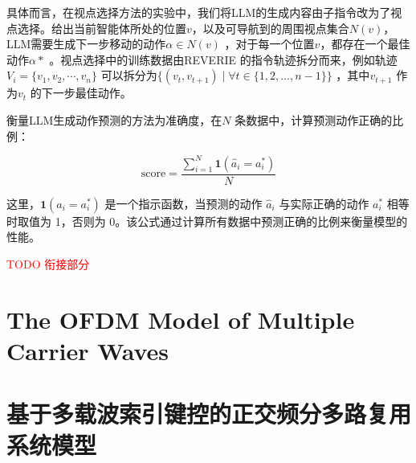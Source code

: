 \documentclass[bachelor]{thesis-uestc}
\begin{document}
具体而言，在视点选择方法的实验中，我们将LLM的生成内容由子指令改为了视点选择。给出当前智能体所处的位置$v$，以及可导航到的周围视点集合$N(v)$，LLM需要生成下一步移动的动作$\alpha \in N(v)$ ，对于每一个位置$v$，都存在一个最佳动作$\alpha*$ 。视点选择中的训练数据由REVERIE 的指令轨迹拆分而来，例如轨迹 $V_i=\{v_1,v_2,\cdots,v_n\}$ 可以拆分为$\{(v_t, v_{t+1}) \mid \forall t \in \{1, 2, \dots, n-1\}\}$ ，其中$v_{t+1}$ 作为$v_t$ 的下一步最佳动作。

衡量LLM生成动作预测的方法为准确度，在$N$ 条数据中，计算预测动作正确的比例：

\[
\text{score} = \frac{\sum_{i=1}^N \mathbf{1}(\hat{a}_i = a^*_i)}{N}
\]

这里，$\mathbf{1}(\hat{a}_i = a^*_i)$ 是一个指示函数，当预测的动作 $\hat{a}_i$ 与实际正确的动作 $a^*_i$ 相等时取值为 1，否则为 0。该公式通过计算所有数据中预测正确的比例来衡量模型的性能。

\textcolor{red}{TODO 衔接部分}



%
% 
%
% 
% 
%


\thesistranslationoriginal
\section{The OFDM Model of Multiple Carrier Waves}

\thesistranslationchinese
\section{基于多载波索引键控的正交频分多路复用系统模型}
\end{document}
